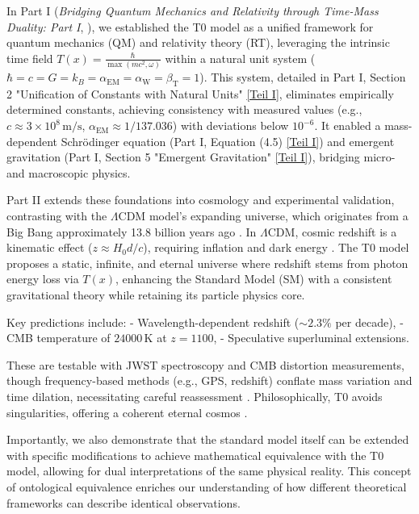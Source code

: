 \documentclass[twocolumn,aps,prl]{revtex4-2}
\newcommand{\Tfield}{T(x)}
\newcommand{\alphaEM}{\alpha_{\text{EM}}}
\newcommand{\alphaW}{\alpha_{\text{W}}}
\newcommand{\betaT}{\beta_{\text{T}}}
\newcommand{\LCDM}{\Lambda\text{CDM}}
\begin{document}
	In Part I (\textit{Bridging Quantum Mechanics and Relativity through Time-Mass Duality: Part I}, \cite{pascher_part1_2025}), we established the T0 model as a unified framework for quantum mechanics (QM) and relativity theory (RT), leveraging the intrinsic time field \(\Tfield = \frac{\hbar}{\max(mc^2, \omega)}\) within a natural unit system (\(\hbar = c = G = k_B = \alphaEM = \alphaW = \betaT = 1\)). This system, detailed in Part I, Section 2 "Unification of Constants with Natural Units" \href{https://github.com/jpascher/T0-Time-Mass-Duality/tree/main/2/pdf/English/QMRelTimeMassPart1En.pdf}{[Teil I]}, eliminates empirically determined constants, achieving consistency with measured values (e.g., \(c \approx 3 \times 10^8 \, \text{m/s}\), \(\alphaEM \approx 1/137.036\)) with deviations below \(10^{-6}\). It enabled a mass-dependent Schrödinger equation (Part I, Equation (4.5) \href{https://github.com/jpascher/T0-Time-Mass-Duality/tree/main/2/pdf/English/QMRelTimeMassPart1En.pdf}{[Teil I]}) and emergent gravitation (Part I, Section 5 "Emergent Gravitation" \href{https://github.com/jpascher/T0-Time-Mass-Duality/tree/main/2/pdf/English/QMRelTimeMassPart1En.pdf}{[Teil I]}), bridging micro- and macroscopic physics.
	
	Part II extends these foundations into cosmology and experimental validation, contrasting with the \(\LCDM\) model's expanding universe, which originates from a Big Bang approximately 13.8 billion years ago \cite{Planck2020}. In \(\LCDM\), cosmic redshift is a kinematic effect (\(z \approx H_0 d / c\)), requiring inflation and dark energy \cite{Riess1998,Perlmutter1999}. The T0 model proposes a static, infinite, and eternal universe where redshift stems from photon energy loss via \(\Tfield\), enhancing the Standard Model (SM) with a consistent gravitational theory while retaining its particle physics core.
	
	Key predictions include:
	- Wavelength-dependent redshift (\(\sim 2.3\%\) per decade),
	- CMB temperature of \(24000 \, \text{K}\) at \(z = 1100\),
	- Speculative superluminal extensions.
	
	These are testable with JWST spectroscopy and CMB distortion measurements, though frequency-based methods (e.g., GPS, redshift) conflate mass variation and time dilation, necessitating careful reassessment \cite{pascher_quantum_2025}. Philosophically, T0 avoids singularities, offering a coherent eternal cosmos \cite{pascher_perspective_2025}.
	
	Importantly, we also demonstrate that the standard model itself can be extended with specific modifications to achieve mathematical equivalence with the T0 model, allowing for dual interpretations of the same physical reality. This concept of ontological equivalence enriches our understanding of how different theoretical frameworks can describe identical observations.
	
\end{document}
